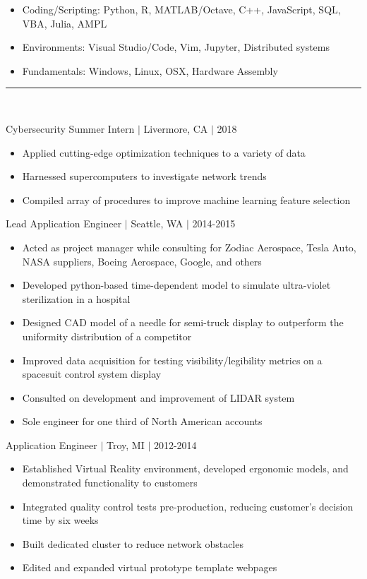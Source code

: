 \documentclass[11pt]{article}
\begin{document}
\begin{itemize}
\item Coding/Scripting: Python, R, MATLAB/Octave, C++, JavaScript, SQL, VBA, Julia, AMPL
\item Environments: Visual Studio/Code, Vim, Jupyter, Distributed systems
\item Fundamentals: Windows, Linux, OSX, Hardware Assembly
\end{itemize}

\vspace{8pt}\hrule\vspace{10pt}
\\
\vspace{-8pt}

\hfill{Cybersecurity Summer Intern $|$ Livermore, CA $|$ 2018}

\begin{itemize}
\item Applied cutting-edge optimization techniques to a variety of data
\item Harnessed supercomputers to investigate network trends
\item Compiled array of procedures to improve machine learning feature selection
\end{itemize}

\hfill { Lead Application Engineer $|$ Seattle, WA $|$ 2014-2015}

\begin{itemize}
\item Acted as project manager while consulting for Zodiac Aerospace, Tesla Auto, NASA suppliers, Boeing Aerospace, Google, and others
\item Developed python-based time-dependent model to simulate ultra-violet sterilization in a hospital
\item Designed CAD model of a needle for semi-truck display to outperform the uniformity distribution of a competitor
\item Improved data acquisition for testing visibility/legibility metrics on a spacesuit control system display
\item Consulted on development and improvement of LIDAR system
\item Sole engineer for one third of North American accounts
\end{itemize}

\hfill { Application Engineer $|$ Troy, MI $|$ 2012-2014}

\begin{itemize}
\item Established Virtual Reality environment, developed ergonomic models, and demonstrated functionality to customers
\item Integrated quality control tests pre-production, reducing customer's decision time by six weeks
\item Built dedicated cluster to reduce network obstacles
\item Edited and expanded virtual prototype template webpages
\end{itemize}
\end{document}
